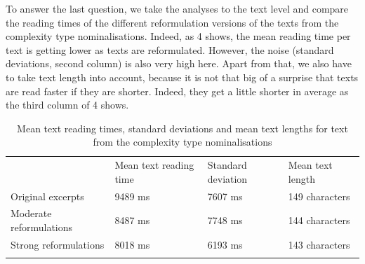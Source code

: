 \documentclass[output=paper]{langsci/langscibook}
\begin{document}
To answer the last question, we take the analyses to the text level and compare the reading times of the different reformulation versions of the texts from the complexity type nominalisations. Indeed, as 4 shows, the mean reading time per text is getting lower as texts are reformulated. However, the noise (standard deviations, second column) is also very high here. Apart from that, we also have to take text length into account, because it is not that big of a surprise that texts are read faster if they are shorter. Indeed, they get a little shorter in average as the third column of 4 shows.
\begin{table}
\begin{tabular}{llll} & Mean text reading time & Standard deviation & Mean text length\\
\lsptoprule
 Original excerpts & 9489 ms & 7607 ms & 149 characters\\
 Moderate reformulations & 8487 ms & 7748 ms & 144 characters\\
 Strong reformulations & 8018 ms & 6193 ms & 143 characters\\
\lspbottomrule
\end{tabular}
\caption{Mean text reading times, standard deviations and mean text lengths for text from the complexity type nominalisations}
\label{tab:4}
\end{table}
\end{document}
